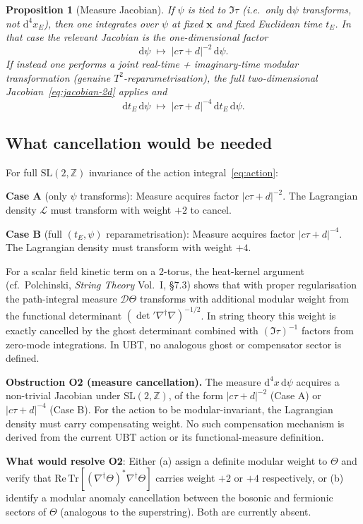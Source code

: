 \documentclass[12pt,a4paper]{article}
\newtheorem{proposition}[theorem]{Proposition}
\theoremstyle{definition}
\theoremstyle{remark}
\newcommand{\SL}{\mathrm{SL}}
\newcommand{\ZZ}{\mathbb{Z}}
\newcommand{\dd}{\mathrm{d}}
\newcommand{\Tr}{\mathrm{Tr}}
\newcommand{\Real}{\mathrm{Re}}
\begin{document}
\begin{proposition}[Measure Jacobian]
\label{prop:jacobian}
If $\psi$ is tied to $\Im\tau$ (i.e.\ only $\dd\psi$ transforms, not
$\dd^4 x_E$), then one integrates over $\psi$ at fixed $\mathbf x$ and
fixed Euclidean time $t_E$.  In that case the relevant Jacobian is the
one-dimensional factor
\begin{equation}
  \dd\psi \;\mapsto\; |c\tau+d|^{-2}\,\dd\psi.
  \label{eq:dpsi-transform}
\end{equation}
If instead one performs a joint real-time + imaginary-time modular
transformation (genuine $T^2$-reparametrisation), the full two-dimensional
Jacobian~\eqref{eq:jacobian-2d} applies and
\begin{equation}
  \dd t_E\,\dd\psi \;\mapsto\; |c\tau+d|^{-4}\,\dd t_E\,\dd\psi.
  \label{eq:full-2d-jacobian}
\end{equation}
\end{proposition}

\subsection{What cancellation would be needed}

For full $\SL(2,\ZZ)$ invariance of the action integral~\eqref{eq:action}:

\medskip
\noindent\textbf{Case A} (only $\psi$ transforms): Measure acquires factor
$|c\tau+d|^{-2}$.  The Lagrangian density $\mathcal L$ must transform with
weight $+2$ to cancel.

\medskip
\noindent\textbf{Case B} (full $(t_E,\psi)$ reparametrisation): Measure
acquires factor $|c\tau+d|^{-4}$.  The Lagrangian density must transform
with weight $+4$.

\medskip
For a scalar field kinetic term on a 2-torus, the heat-kernel argument
(cf.\ Polchinski, \emph{String Theory} Vol.~I, \S7.3) shows that with
proper regularisation the path-integral measure $\mathcal D\Theta$ transforms
with additional modular weight from the functional determinant $(\det'\nabla^\dagger\nabla)^{-1/2}$.
In string theory this weight is exactly cancelled by the ghost determinant
combined with $(\Im\tau)^{-1}$ factors from zero-mode integrations.
In UBT, no analogous ghost or compensator sector is defined.

\begin{gapbox}
\textbf{Obstruction O2 (measure cancellation).}
The measure $\dd^4x\,\dd\psi$ acquires a non-trivial Jacobian under
$\SL(2,\ZZ)$, of the form $|c\tau+d|^{-2}$ (Case A) or $|c\tau+d|^{-4}$
(Case B).  For the action to be modular-invariant, the Lagrangian density
must carry compensating weight.  No such compensation mechanism is derived
from the current UBT action or its functional-measure definition.

\medskip\noindent
\textbf{What would resolve O2}: Either (a) assign a definite modular weight
to $\Theta$ and verify that $\Real\,\Tr[(\nabla^\dagger\Theta)^\ast\nabla^\dagger\Theta]$
carries weight $+2$ or $+4$ respectively, or (b) identify a modular anomaly
cancellation between the bosonic and fermionic sectors of $\Theta$ (analogous
to the superstring).  Both are currently absent.
\end{gapbox}
\end{document}
